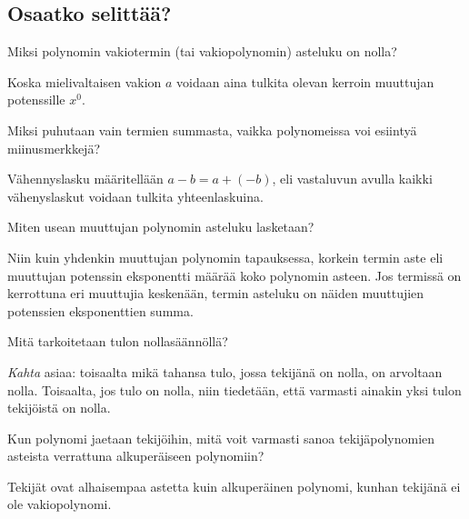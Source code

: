 \subsection*{Osaatko selittää?}

\begin{tehtava}
Miksi polynomin vakiotermin (tai vakiopolynomin) asteluku on nolla?
	\begin{vastaus}
	Koska mielivaltaisen vakion $a$ voidaan aina tulkita olevan kerroin muuttujan potenssille $x^0$.
	\end{vastaus}
\end{tehtava}

\begin{tehtava}
Miksi puhutaan vain termien summasta, vaikka polynomeissa voi esiintyä miinusmerkkejä?
	\begin{vastaus}
	Vähennyslasku määritellään $a-b=a+(-b)$, eli vastaluvun avulla kaikki vähenyslaskut voidaan tulkita yhteenlaskuina.
	\end{vastaus}
\end{tehtava}

\begin{tehtava}
Miten usean muuttujan polynomin asteluku lasketaan?
	\begin{vastaus}
	Niin kuin yhdenkin muuttujan polynomin tapauksessa, korkein termin aste eli muuttujan potenssin eksponentti määrää koko polynomin asteen. Jos termissä on kerrottuna eri muuttujia keskenään, termin asteluku on näiden muuttujien potenssien eksponenttien summa.
	\end{vastaus}
\end{tehtava}

\begin{tehtava}
Mitä tarkoitetaan tulon nollasäännöllä?
	\begin{vastaus}
\textit{Kahta} asiaa: toisaalta mikä tahansa tulo, jossa tekijänä on nolla, on arvoltaan nolla. Toisaalta, jos tulo on nolla, niin tiedetään, että varmasti ainakin yksi tulon tekijöistä on nolla.
	\end{vastaus}
\end{tehtava}

\begin{tehtava}
Kun polynomi jaetaan tekijöihin, mitä voit varmasti sanoa tekijäpolynomien asteista verrattuna alkuperäiseen polynomiin?
	\begin{vastaus}
Tekijät ovat alhaisempaa astetta kuin alkuperäinen polynomi, kunhan tekijänä ei ole vakiopolynomi.
	\end{vastaus}
\end{tehtava}

